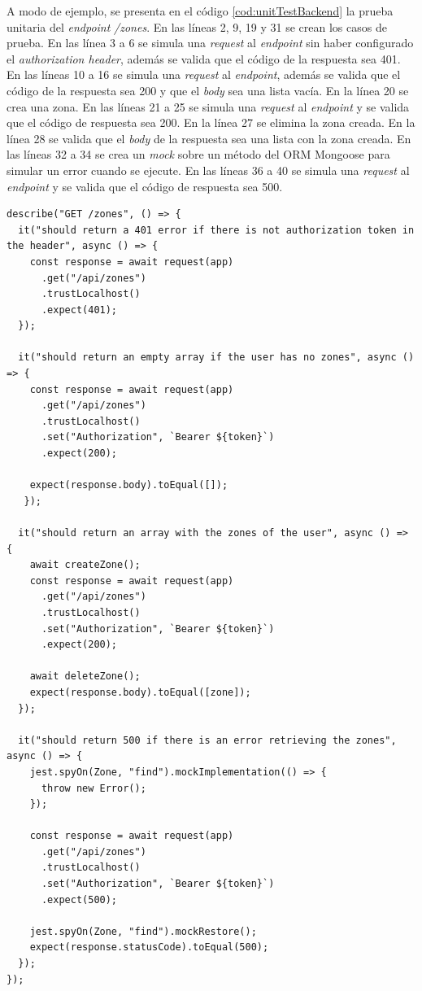 A modo de ejemplo, se presenta en el código \ref{cod:unitTestBackend} la prueba unitaria del \emph{endpoint} \textit{/zones}. En las líneas 2, 9, 19 y 31 se crean los casos de prueba. En las línea 3 a 6 se simula una \emph{request} al \emph{endpoint} sin haber configurado el \textit{authorization header}, además se valida que el código de la respuesta sea 401. En las líneas 10 a 16 se simula una \emph{request} al \emph{endpoint}, además se valida que el código de la respuesta sea 200 y que el \textit{body} sea una lista vacía. En la línea 20 se crea una zona. En las líneas 21 a 25 se simula una \emph{request} al \emph{endpoint} y se valida que el código de respuesta sea 200. En la línea 27 se elimina la zona creada. En la línea 28 se valida que el \textit{body} de la respuesta sea una lista con la zona creada. En las líneas  32 a 34 se crea un \emph{mock} sobre un método del ORM Mongoose para simular un error cuando se ejecute. En las líneas 36 a 40 se simula una \emph{request} al \emph{endpoint} y se valida que el código de respuesta sea 500.

\begin{lstlisting}[label=cod:unitTestBackend,caption=Prueba unitaria del \emph{endpoint /zones}]
describe("GET /zones", () => {
  it("should return a 401 error if there is not authorization token in the header", async () => {
    const response = await request(app)
      .get("/api/zones")
      .trustLocalhost()
      .expect(401);
  });

  it("should return an empty array if the user has no zones", async () => {
    const response = await request(app)
      .get("/api/zones")
      .trustLocalhost()
      .set("Authorization", `Bearer ${token}`)
      .expect(200);

    expect(response.body).toEqual([]);
   });

  it("should return an array with the zones of the user", async () => {
    await createZone();
    const response = await request(app)
      .get("/api/zones")
      .trustLocalhost()
      .set("Authorization", `Bearer ${token}`)
      .expect(200);

    await deleteZone();
    expect(response.body).toEqual([zone]);
  });

  it("should return 500 if there is an error retrieving the zones", async () => {
    jest.spyOn(Zone, "find").mockImplementation(() => {
      throw new Error();
    });

    const response = await request(app)
      .get("/api/zones")
      .trustLocalhost()
      .set("Authorization", `Bearer ${token}`)
      .expect(500);

    jest.spyOn(Zone, "find").mockRestore();
    expect(response.statusCode).toEqual(500);
  });
});
\end{lstlisting} 

